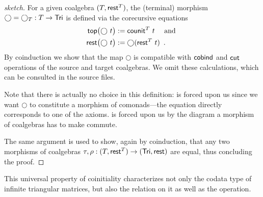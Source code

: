 \documentclass[envcountsame]{llncs}
\begin{document}
\begin{Long}
\begin{proof}[sketch]
   For a given coalgebra $(T,\mathsf{rest}^T)$, the (terminal) morphism $\bigcirc = \bigcirc_T:T\to\mathsf{Tri}$ is defined via the corecursive equations
    \begin{align}\mathsf{top}\bigl(\bigcirc~t\bigr) &:= \mathsf{counit}^T~t \quad\text{ and } \label{eq:terminal_top}\\
                     \mathsf{rest}\bigl(\bigcirc~t\bigr) &:= \bigcirc(\mathsf{rest}^T~t) \enspace . \label{eq:terminal_rest}
      \end{align}
      By coinduction we show that the map $\bigcirc$ is compatible with $\mathsf{cobind}$ and $\mathsf{cut}$ operations of the source and 
   target coalgebras. We omit these calculations, which can be consulted in the \coq source files.
   
   Note that there is actually no choice in this definition:  is forced upon us since we want $\bigcirc$ to constitute 
   a morphism of comonads---the equation directly corresponds to one of the axioms.
    is forced upon us by the diagram a morphism of coalgebras has to make commute.
   
   The same argument is used to show, again by coinduction, that any two morphisms of coalgebras $\tau,\rho : (T,\mathsf{rest}^T) \to (\mathsf{Tri},\mathsf{rest})$
   are equal, thus concluding the proof.   
\end{proof}
\end{Long}

This universal property of coinitiality characterizes not only the codata type of infinite triangular matrices, but also
the  relation on it as well as the  operation.

\end{document}
